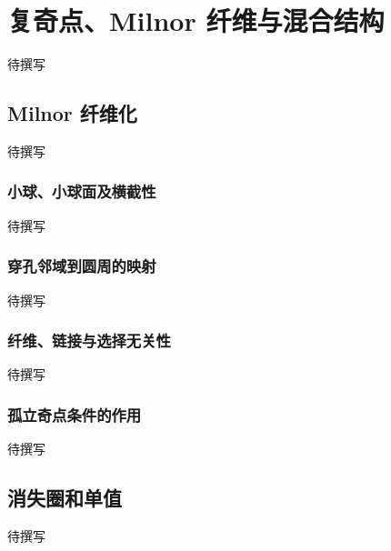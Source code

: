 
% 
% 
% 
% 
% 
% 

\chapter{复奇点、Milnor 纤维与混合结构}
\label{g4:app:B}

待撰写

\section{Milnor 纤维化}
\label{g4:sec:B01}
待撰写

\subsection{小球、小球面及横截性}
\label{g4:subsec:B01:01}
待撰写

\subsection{穿孔邻域到圆周的映射}
\label{g4:subsec:B01:02}
待撰写

\subsection{纤维、链接与选择无关性}
\label{g4:subsec:B01:03}
待撰写

\subsection{孤立奇点条件的作用}
\label{g4:subsec:B01:04}
待撰写

\section{消失圈和单值}
\label{g4:sec:B02}
待撰写

